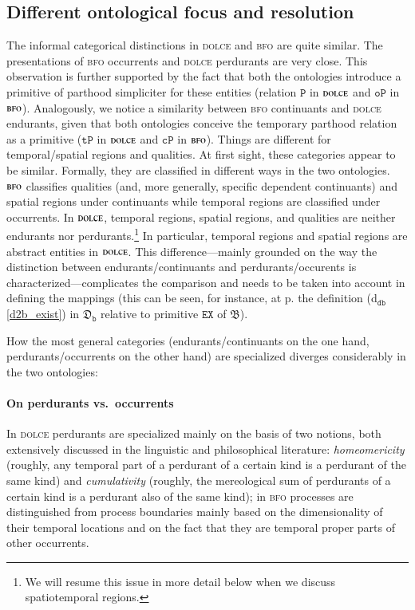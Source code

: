 \documentclass[ao]{iosart2x}
\newcommand{\dbDefLabel}{\textrm{d$_\texttt{db}$}}
\newcommand{\refdbdf}[1]{({\dbDefLabel}\ref{#1})}
\newcommand{\pr}[1]{\mathtt{#1}}
\newcommand{\dolce}{{\textsc{dolce}}}
\newcommand{\bfo}{{\textsc{bfo}}}
\newcommand {\thbfo} {\ensuremath{\mathfrak{B}}}
\newcommand {\thdolcedbmap} {\ensuremath{\mathfrak{D}_\texttt{b}}}
\newcommand {\TPd} {\ensuremath{\pr{tP}}}
\newcommand {\Pd} {\ensuremath{\pr{P}}}
\newcommand{\bfocpart}{\pr{cP}}
\newcommand{\bfoopart}{\pr{oP}}
\newcommand{\bfoexist}{\pr{EX}}
\begin{document}
\subsection{Different ontological focus and resolution}\label{sect_diff_resolution}

The informal categorical distinctions in {\dolce} and {\bfo} are quite similar. The presentations of {\bfo} occurrents and {\dolce} perdurants are very close. This observation is further supported by the fact that both the ontologies introduce a primitive of parthood simpliciter for these entities (relation $\Pd$ in {$\dolce$} and $\bfoopart$ in {$\bfo$}). 
Analogously, we notice a similarity between {\bfo} continuants and {\dolce} endurants, given that both ontologies conceive the temporary parthood relation as a primitive ($\TPd$ in {$\dolce$} and $\bfocpart$ in {$\bfo$}).
Things are different for temporal/spatial  regions and qualities. At first sight, these categories appear to be similar. Formally, they are classified in different ways in the two ontologies. 
{$\bfo$} classifies qualities (and, more generally, specific dependent continuants) and spatial regions under continuants while temporal regions are classified under occurrents. In {$\dolce$}, temporal regions, spatial regions, and qualities are neither endurants nor perdurants.\footnote{We will resume this issue in more detail below when we discuss spatiotemporal regions.} In particular, temporal regions and spatial regions are abstract entities in {$\dolce$}. This difference---mainly grounded on the way the distinction between endurants/continuants  and perdurants/occurents is characterized---complicates the comparison and needs to be taken into account in defining the mappings (this can be seen, for instance, at p.\pageref{d2b_exist} the definition \refdbdf{d2b_exist} in $\thdolcedbmap$ relative to primitive $\bfoexist$ of {$\thbfo$}).      

How the most general categories (endurants/continuants on the one hand, perdurants/occurrents on the other hand) are specialized diverges considerably in the two ontologies:

\paragraph{On perdurants vs.~occurrents} In {\dolce} perdurants are specialized mainly on the basis of two notions, both extensively discussed in the linguistic and philosophical literature: \emph{homeomericity} (roughly, any temporal part of a perdurant of a certain kind is a perdurant of the same kind) and \emph{cumulativity} (roughly, the mereological sum of perdurants of a certain kind is a perdurant also of the same kind); in {\bfo} processes are distinguished from process boundaries mainly based on the dimensionality of their temporal locations and on the fact that they are temporal proper parts of other occurrents.
\end{document}
